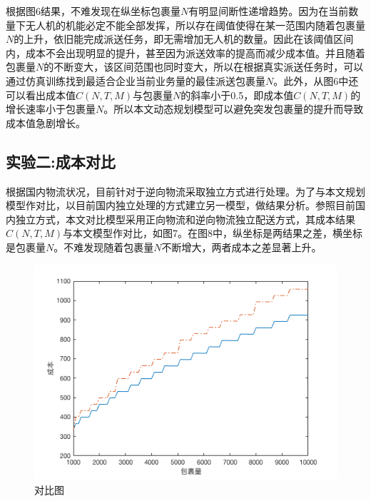 \documentclass[twocolumn]{jbuaa}
\begin{document}
	根据图6结果，不难发现在纵坐标包裹量$N$有明显间断性递增趋势。因为在当前数量下无人机的机能必定不能全部发挥，所以存在阈值使得在某一范围内随着包裹量$N$的上升，依旧能完成派送任务，即无需增加无人机的数量。因此在该阈值区间内，成本不会出现明显的提升，甚至因为派送效率的提高而减少成本值。并且随着包裹量$N$的不断变大，该区间范围也同时变大，所以在根据真实派送任务时，可以通过仿真训练找到最适合企业当前业务量的最佳派送包裹量$N$。此外，从图6中还可以看出成本值$C(N,T,M)$与包裹量$N$的斜率小于0.5，即成本值$C(N,T,M)$的增长速率小于包裹量$N$。所以本文动态规划模型可以避免突发包裹量的提升而导致成本值急剧增长。
















	\subsection{实验二:成本对比}
	根据国内物流状况，目前针对于逆向物流采取独立方式进行处理。为了与本文规划模型作对比，以目前国内独立处理的方式建立另一模型，做结果分析。参照目前国内独立方式，本文对比模型采用正向物流和逆向物流独立配送方式，其成本结果$C(N,T,M)$与本文模型作对比，如图7。在图8中，纵坐标是两结果之差，横坐标是包裹量$N$。不难发现随着包裹量$N$不断增大，两者成本之差显著上升。

	\begin{figure}[!h]
	\centering
	\includegraphics[scale=0.4]{Figs/compare.png}
	\caption{对比图}
	\label{fig:07}
	\end{figure}
\end{document}
